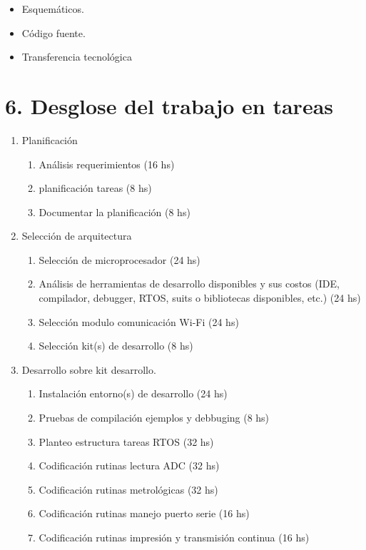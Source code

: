 \documentclass[11pt]{charter}
\begin{document}
\begin{itemize}
\item Esquemáticos.
\item Código fuente.
\item Transferencia tecnológica

\end{itemize}



\section{6. Desglose del trabajo en tareas}
\label{sec:wbs}



\begin{enumerate}
\item Planificación
	\begin{enumerate}
	\item Análisis requerimientos (16 hs)
	\item planificación tareas (8 hs)
	\item Documentar la planificación (8 hs)
	\end{enumerate}
\item Selección de arquitectura
	\begin{enumerate}
	\item Selección de microprocesador (24 hs)
	\item Análisis de herramientas de desarrollo disponibles y sus costos (IDE, compilador, debugger, RTOS, suits o bibliotecas disponibles, etc.) (24 hs)
	\item Selección modulo comunicación Wi-Fi (24 hs)
	\item Selección kit(s) de desarrollo (8 hs)
	\end{enumerate}
\item Desarrollo sobre kit desarrollo.
	\begin{enumerate}
	\item Instalación entorno(s) de desarrollo (24 hs)
	\item Pruebas de compilación ejemplos y debbuging (8 hs)
	\item Planteo estructura tareas RTOS	(32 hs)
	\item Codificación rutinas lectura ADC (32 hs)
	\item Codificación rutinas metrológicas (32 hs)
	\item Codificación rutinas manejo puerto serie (16 hs)
	\item Codificación rutinas impresión y transmisión continua (16 hs)

\end{enumerate}
\end{enumerate}
\end{document}
